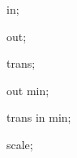 %
%

{
  

  \attribute in;
  
  \attribute out;
  
  \attribute trans;

  \attribute out min;

  \attribute trans in min;

  \attribute scale;

}
